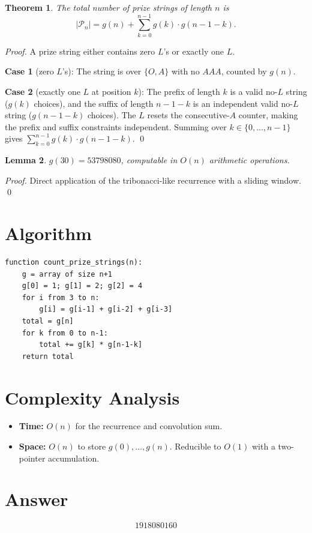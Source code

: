 \documentclass[12pt]{article}
\newtheorem{theorem}{Theorem}
\newtheorem{lemma}[theorem]{Lemma}
\begin{document}
\begin{theorem}
The total number of prize strings of length $n$ is
\[
    |\mathcal{P}_n| = g(n) + \sum_{k=0}^{n-1} g(k) \cdot g(n-1-k).
\]
\end{theorem}

\begin{proof}
A prize string either contains zero $L$'s or exactly one $L$.

\textbf{Case 1} (zero $L$'s): The string is over $\{O, A\}$ with no $AAA$, counted by $g(n)$.

\textbf{Case 2} (exactly one $L$ at position $k$): The prefix of length $k$ is a valid no-$L$ string ($g(k)$ choices), and the suffix of length $n-1-k$ is an independent valid no-$L$ string ($g(n-1-k)$ choices). The $L$ resets the consecutive-$A$ counter, making the prefix and suffix constraints independent. Summing over $k \in \{0, \ldots, n-1\}$ gives $\sum_{k=0}^{n-1} g(k) \cdot g(n-1-k)$. \qed
\end{proof}

\begin{lemma}
$g(30) = 53798080$, computable in $O(n)$ arithmetic operations.
\end{lemma}

\begin{proof}
Direct application of the tribonacci-like recurrence with a sliding window. \qed
\end{proof}

\section{Algorithm}

\begin{verbatim}
function count_prize_strings(n):
    g = array of size n+1
    g[0] = 1; g[1] = 2; g[2] = 4
    for i from 3 to n:
        g[i] = g[i-1] + g[i-2] + g[i-3]
    total = g[n]
    for k from 0 to n-1:
        total += g[k] * g[n-1-k]
    return total
\end{verbatim}

\section{Complexity Analysis}

\begin{itemize}
    \item \textbf{Time:} $O(n)$ for the recurrence and convolution sum.
    \item \textbf{Space:} $O(n)$ to store $g(0), \ldots, g(n)$. Reducible to $O(1)$ with a two-pointer accumulation.
\end{itemize}

\section{Answer}

\[
\boxed{1918080160}
\]
\end{document}
